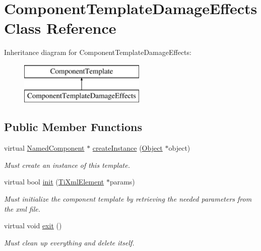 \hypertarget{classComponentTemplateDamageEffects}{
\section{\-Component\-Template\-Damage\-Effects \-Class \-Reference}
\label{d6/d39/classComponentTemplateDamageEffects}
}
\-Inheritance diagram for \-Component\-Template\-Damage\-Effects\-:\begin{figure}[H]
\begin{center}
\leavevmode
\includegraphics[height=2.000000cm]{d6/d39/classComponentTemplateDamageEffects}
\end{center}
\end{figure}
\subsection*{\-Public \-Member \-Functions}
\begin{DoxyCompactItemize}
\item 
\hypertarget{classComponentTemplateDamageEffects_aa02009f8ed05d505de58d1468a430f0d}{
virtual \hyperlink{classNamedComponent}{\-Named\-Component} $\ast$ \hyperlink{classComponentTemplateDamageEffects_aa02009f8ed05d505de58d1468a430f0d}{create\-Instance} (\hyperlink{classObject}{\-Object} $\ast$object)}
\label{d6/d39/classComponentTemplateDamageEffects_aa02009f8ed05d505de58d1468a430f0d}

\begin{DoxyCompactList}\small\item\em \-Must create an instance of this template. \end{DoxyCompactList}\item 
\hypertarget{classComponentTemplateDamageEffects_a571600e443952107f5bead43489f38bd}{
virtual bool \hyperlink{classComponentTemplateDamageEffects_a571600e443952107f5bead43489f38bd}{init} (\hyperlink{classTiXmlElement}{\-Ti\-Xml\-Element} $\ast$params)}
\label{d6/d39/classComponentTemplateDamageEffects_a571600e443952107f5bead43489f38bd}

\begin{DoxyCompactList}\small\item\em \-Must initialize the component template by retrieving the needed parameters from the xml file. \end{DoxyCompactList}\item 
\hypertarget{classComponentTemplateDamageEffects_a4549db08f99381ba9f238760f01f0164}{
virtual void \hyperlink{classComponentTemplateDamageEffects_a4549db08f99381ba9f238760f01f0164}{exit} ()}
\label{d6/d39/classComponentTemplateDamageEffects_a4549db08f99381ba9f238760f01f0164}

\begin{DoxyCompactList}\small\item\em \-Must clean up everything and delete itself. \end{DoxyCompactList}\end{DoxyCompactItemize}
